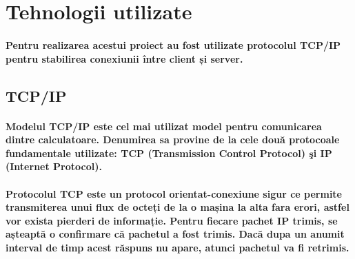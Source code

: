 \documentclass{article}
\begin{document}
	\newpage
	\section{Tehnologii utilizate}
	\paragraph{
		Pentru realizarea acestui proiect au fost utilizate protocolul TCP/IP pentru stabilirea conexiunii între client și server.
	}
	
	\subsection{TCP/IP}
	
	\paragraph{
		Modelul TCP/IP este cel mai utilizat model pentru comunicarea dintre
		calculatoare. Denumirea sa provine de la cele două protocoale fundamentale
		utilizate: TCP (Transmission Control Protocol) şi IP (Internet Protocol).
	}
	
	\paragraph{
		Protocolul TCP este un protocol orientat-conexiune sigur ce permite transmiterea unui flux de octeți de la o mașina la alta fara erori, astfel vor exista pierderi de informație. Pentru fiecare pachet IP trimis, se așteaptă o confirmare că pachetul a fost trimis. Dacă dupa un anumit interval de timp acest răspuns nu apare, atunci pachetul va fi retrimis.
	}
\end{document}
